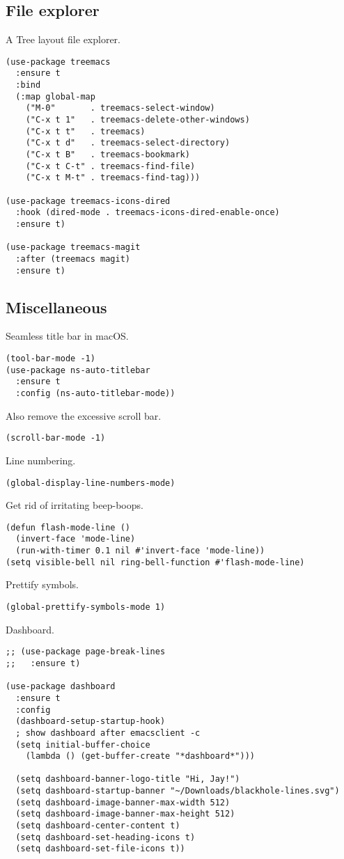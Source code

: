 \documentclass[a4paper,11pt]{article}
\begin{document}
\subsection{File explorer}
\label{sec:orga6c0b7b}
A Tree layout file explorer.
\begin{verbatim}
(use-package treemacs
  :ensure t
  :bind
  (:map global-map
    ("M-0"       . treemacs-select-window)
    ("C-x t 1"   . treemacs-delete-other-windows)
    ("C-x t t"   . treemacs)
    ("C-x t d"   . treemacs-select-directory)
    ("C-x t B"   . treemacs-bookmark)
    ("C-x t C-t" . treemacs-find-file)
    ("C-x t M-t" . treemacs-find-tag)))

(use-package treemacs-icons-dired
  :hook (dired-mode . treemacs-icons-dired-enable-once)
  :ensure t)

(use-package treemacs-magit
  :after (treemacs magit)
  :ensure t)
\end{verbatim}

\subsection{Miscellaneous}
\label{sec:org13002be}
Seamless title bar in macOS.
\begin{verbatim}
(tool-bar-mode -1)
(use-package ns-auto-titlebar
  :ensure t
  :config (ns-auto-titlebar-mode))
\end{verbatim}

Also remove the excessive scroll bar.
\begin{verbatim}
(scroll-bar-mode -1)
\end{verbatim}

Line numbering.
\begin{verbatim}
(global-display-line-numbers-mode)
\end{verbatim}

Get rid of irritating beep-boops.
\begin{verbatim}
(defun flash-mode-line ()
  (invert-face 'mode-line)
  (run-with-timer 0.1 nil #'invert-face 'mode-line))
(setq visible-bell nil ring-bell-function #'flash-mode-line)
\end{verbatim}

Prettify symbols.
\begin{verbatim}
(global-prettify-symbols-mode 1)
\end{verbatim}

Dashboard.
\begin{verbatim}
;; (use-package page-break-lines
;;   :ensure t)

(use-package dashboard
  :ensure t
  :config
  (dashboard-setup-startup-hook)
  ; show dashboard after emacsclient -c
  (setq initial-buffer-choice
    (lambda () (get-buffer-create "*dashboard*")))

  (setq dashboard-banner-logo-title "Hi, Jay!")
  (setq dashboard-startup-banner "~/Downloads/blackhole-lines.svg")
  (setq dashboard-image-banner-max-width 512)
  (setq dashboard-image-banner-max-height 512)
  (setq dashboard-center-content t)
  (setq dashboard-set-heading-icons t)
  (setq dashboard-set-file-icons t))
\end{verbatim}
\end{document}
